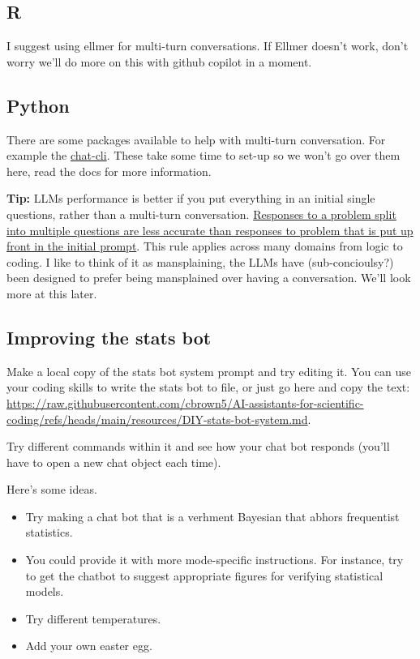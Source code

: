\documentclass[
  letterpaper,
  DIV=11,
  numbers=noendperiod]{scrreprt}
\providecommand{\tightlist}{%
  \setlength{\itemsep}{0pt}\setlength{\parskip}{0pt}}\usepackage{longtable,booktabs,array}
\begin{document}
\subsection{R}

I suggest using ellmer for multi-turn conversations. If Ellmer doesn't
work, don't worry we'll do more on this with github copilot in a moment.

\subsection{Python}

There are some packages available to help with multi-turn conversation.
For example the
\href{https://deepwiki.com/potofo/openrouter-chat-cli/1-overview}{chat-cli}.
These take some time to set-up so we won't go over them here, read the
docs for more information.

\textbf{Tip:} LLMs performance is better if you put everything in an
initial single questions, rather than a multi-turn conversation.
\href{https://arxiv.org/abs/2505.06120}{Responses to a problem split
into multiple questions are less accurate than responses to problem that
is put up front in the initial prompt}. This rule applies across many
domains from logic to coding. I like to think of it as mansplaining, the
LLMs have (sub-concioulsy?) been designed to prefer being mansplained
over having a conversation. We'll look more at this later.

\subsection{Improving the stats bot}\label{improving-the-stats-bot}

Make a local copy of the stats bot system prompt and try editing it. You
can use your coding skills to write the stats bot to file, or just go
here and copy the text:
\url{https://raw.githubusercontent.com/cbrown5/AI-assistants-for-scientific-coding/refs/heads/main/resources/DIY-stats-bot-system.md}.

Try different commands within it and see how your chat bot responds
(you'll have to open a new chat object each time).

Here's some ideas.

\begin{itemize}
\tightlist
\item
  Try making a chat bot that is a verhment Bayesian that abhors
  frequentist statistics.\\
\item
  You could provide it with more mode-specific instructions. For
  instance, try to get the chatbot to suggest appropriate figures for
  verifying statistical models.
\item
  Try different temperatures.
\item
  Add your own easter egg.
\end{itemize}
\end{document}
